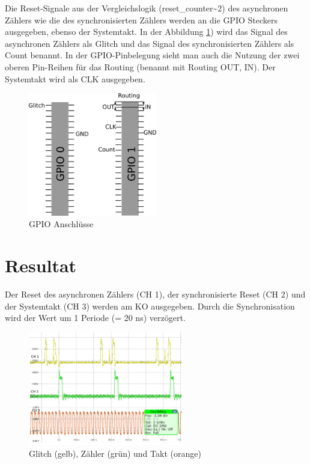 Die Reset-Signale aus der Vergleichslogik (reset\_counter\~{}2) des asynchronen Zählers wie die des synchronisierten Zählers werden an die GPIO Steckers ausgegeben, ebenso der Systemtakt. In der Abbildung \ref{fig.glitch.GPIO}) wird das Signal des asynchronen Zählers als Glitch und das Signal des synchronisierten Zählers als Count benannt. In der GPIO-Pinbelegung sieht man auch die Nutzung der zwei oberen Pin-Reihen für das Routing (benannt mit Routing OUT, IN). Der Systemtakt wird als CLK ausgegeben.

\begin{figure}[H]
	\includegraphics[width=0.5\textwidth]{images/glitch/GPIO_Belegung.png}
	\caption{GPIO Anschlüsse}
	\label{fig.glitch.GPIO}
\end{figure}


\newpage
\section{Resultat }\label{sect.glitch_resultat}

Der Reset des asynchronen Zählers (CH 1), der synchronisierte Reset (CH 2) und der Systemtakt (CH 3) werden am KO ausgegeben. Durch die Synchronisation wird der Wert um 1 Periode (= 20 ns) verzögert.

\begin{figure}[H]
	\includegraphics[width=0.6\textwidth]{images/glitch/Glitch_2_good.png}
	\caption{Glitch (gelb), Zähler (grün) und Takt (orange)}
	\label{fig.glitch.result_1}
\end{figure}

